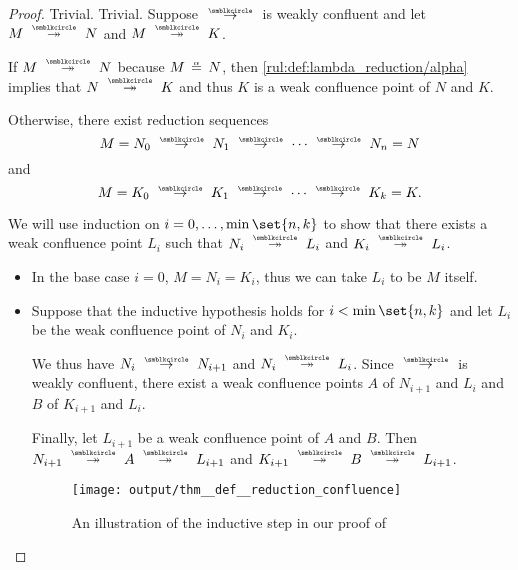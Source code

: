\begin{proof}
   Trivial.
   Trivial.
   Suppose \( {\pred} \) is weakly confluent and let \( M \pred* N \) and \( M \pred* K \).

  If \( M \pred* N \) because \( M \aequiv N \), then \ref{rul:def:lambda_reduction/alpha} implies that \( N \pred* K \) and thus \( K \) is a weak confluence point of \( N \) and \( K \).

  Otherwise, there exist reduction sequences
  \begin{equation*}
    M = N_0 \pred N_1 \pred \cdots \pred N_n = N
  \end{equation*}
  and
  \begin{equation*}
    M = K_0 \pred K_1 \pred \cdots \pred K_k = K.
  \end{equation*}

  We will use induction on \( i = 0, \ldots, \min\set{ n, k } \) to show that there exists a weak confluence point \( L_i \) such that \( N_i \pred* L_i \) and \( K_i \pred* L_i \).

  \begin{itemize}
    \item In the base case \( i = 0 \), \( M = N_i = K_i \), thus we can take \( L_i \) to be \( M \) itself.

    \item Suppose that the inductive hypothesis holds for \( i < \min\set{ n, k } \) and let \( L_i \) be the weak confluence point of \( N_i \) and \( K_i \).

    We thus have \( N_i \pred N_{i+1} \) and \( N_i \pred* L_i \). Since \( {\pred} \) is weakly confluent, there exist a weak confluence points \( A \) of \( N_{i+1} \) and \( L_i \) and \( B \) of \( K_{i+1} \) and \( L_i \).

    Finally, let \( L_{i+1} \) be a weak confluence point of \( A \) and \( B \). Then \( N_{i+1} \pred* A \pred* L_{i+1} \) and \( K_{i+1} \pred* B \pred* L_{i+1} \).

    \begin{figure}[!ht]
      \centering
      \texttt{[image: output/thm\_\_def\_\_reduction\_confluence]}
      \caption{An illustration of the inductive step in our proof of }\label{fig:thm:confluence_of_reflexive_transitive_closure}
    \end{figure}
  \end{itemize}


\end{proof}
